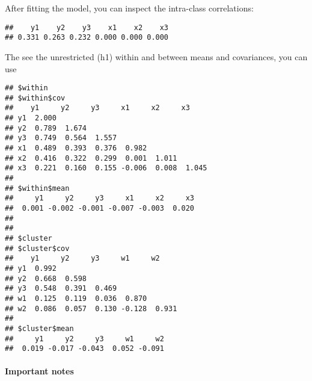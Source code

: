 After fitting the model, you can inspect the intra-class correlations:

\begin{Shaded}
\begin{Highlighting}[]
    \NormalTok{)}
\end{Highlighting}
\end{Shaded}

\begin{verbatim}
##    y1    y2    y3    x1    x2    x3 
## 0.331 0.263 0.232 0.000 0.000 0.000
\end{verbatim}

The see the unrestricted (h1) within and between means and covariances,
you can use

\begin{Shaded}
\begin{Highlighting}[]
    \NormalTok{)}
\end{Highlighting}
\end{Shaded}

\begin{verbatim}
## $within
## $within$cov
##    y1     y2     y3     x1     x2     x3    
## y1  2.000                                   
## y2  0.789  1.674                            
## y3  0.749  0.564  1.557                     
## x1  0.489  0.393  0.376  0.982              
## x2  0.416  0.322  0.299  0.001  1.011       
## x3  0.221  0.160  0.155 -0.006  0.008  1.045
## 
## $within$mean
##     y1     y2     y3     x1     x2     x3 
##  0.001 -0.002 -0.001 -0.007 -0.003  0.020 
## 
## 
## $cluster
## $cluster$cov
##    y1     y2     y3     w1     w2    
## y1  0.992                            
## y2  0.668  0.598                     
## y3  0.548  0.391  0.469              
## w1  0.125  0.119  0.036  0.870       
## w2  0.086  0.057  0.130 -0.128  0.931
## 
## $cluster$mean
##     y1     y2     y3     w1     w2 
##  0.019 -0.017 -0.043  0.052 -0.091
\end{verbatim}

\hypertarget{important-notes}{%
\paragraph{Important notes}\label{important-notes}}

